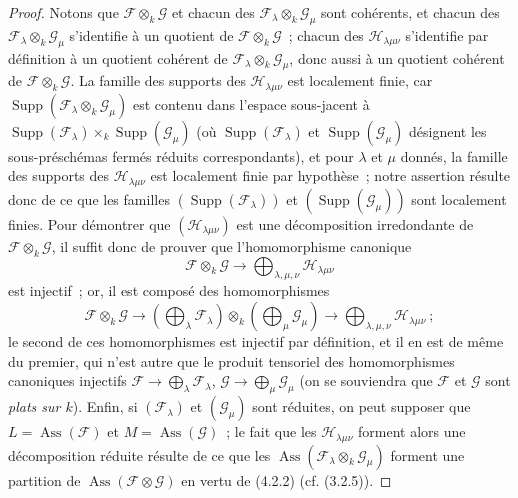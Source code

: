 \begin{proof}
Notons que $\mathcal F\otimes_k\mathcal G$ et chacun des
$\mathcal F_\lambda\otimes_k\mathcal G_\mu$ sont cohérents, et chacun des
$\mathcal F_\lambda\otimes_k\mathcal G_\mu$ s'identifie à un quotient de
$\mathcal F\otimes_k\mathcal G$~; chacun des $\mathcal H_{\lambda\mu\nu}$
s'identifie par définition à un quotient cohérent de
$\mathcal F_\lambda\otimes_k\mathcal G_\mu$, donc aussi à un quotient
cohérent de $\mathcal F\otimes_k\mathcal G$. La famille des supports des
$\mathcal H_{\lambda\mu\nu}$ est localement finie, car
$\operatorname{Supp}(\mathcal F_\lambda\otimes_k\mathcal G_\mu)$ est contenu
dans l'espace sous-jacent à
$\operatorname{Supp}(\mathcal F_\lambda)\times_k
\operatorname{Supp}(\mathcal G_\mu)$ (où
$\operatorname{Supp}(\mathcal F_\lambda)$ et
$\operatorname{Supp}(\mathcal G_\mu)$ désignent les sous-préschémas fermés
réduits correspondants), et pour $\lambda$ et $\mu$ donnés, la famille des
supports des $\mathcal H_{\lambda\mu\nu}$ est localement finie par hypothèse~;
notre assertion résulte donc de ce que les familles
$(\operatorname{Supp}(\mathcal F_\lambda))$ et
$(\operatorname{Supp}(\mathcal G_\mu))$ sont localement finies. Pour démontrer
que $(\mathcal H_{\lambda\mu\nu})$ est une décomposition irredondante de
$\mathcal F\otimes_k\mathcal G$, il suffit donc de prouver que
l'homomorphisme canonique
\[
\mathcal F\otimes_k\mathcal G
\longrightarrow\bigoplus_{\lambda,\mu,\nu}\mathcal H_{\lambda\mu\nu}
\]
est injectif~; or, il est composé des homomorphismes
\[
\mathcal F\otimes_k\mathcal G
\longrightarrow
\left(\bigoplus_\lambda\mathcal F_\lambda\right)\otimes_k
\left(\bigoplus_\mu\mathcal G_\mu\right)
\longrightarrow\bigoplus_{\lambda,\mu,\nu}\mathcal H_{\lambda\mu\nu}~;
\]
le second de ces homomorphismes est injectif par définition, et il en est de
même du premier, qui n'est autre que le produit tensoriel des homomorphismes
canoniques injectifs
$\mathcal F\to\bigoplus_\lambda\mathcal F_\lambda$,
$\mathcal G\to\bigoplus_\mu\mathcal G_\mu$ (on se souviendra que
$\mathcal F$ et $\mathcal G$ sont \emph{plats sur $k$}). Enfin, si
$(\mathcal F_\lambda)$ et $(\mathcal G_\mu)$ sont réduites, on peut supposer
que $L=\operatorname{Ass}(\mathcal F)$ et
$M=\operatorname{Ass}(\mathcal G)$~; le fait que les
$\mathcal H_{\lambda\mu\nu}$ forment alors une décomposition réduite résulte
de ce que les $\operatorname{Ass}(\mathcal F_\lambda\otimes_k
\mathcal G_\mu)$ forment une partition de
$\operatorname{Ass}(\mathcal F\otimes\mathcal G)$ en vertu de (4.2.2)
(cf. (3.2.5)).
\end{proof}

